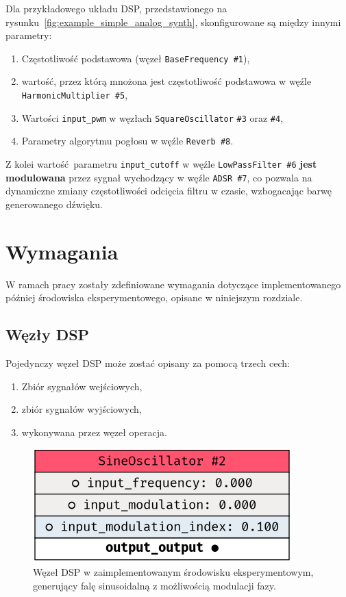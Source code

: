 \noindent
Dla przykładowego układu DSP, przedstawionego na rysunku~\ref{fig:example_simple_analog_synth},
skonfigurowane są między innymi parametry:

\begin{enumerate}
  \item Częstotliwość podstawowa (węzeł \texttt{BaseFrequency \#1}),
  \item wartość, przez którą mnożona jest częstotliwość podstawowa w węźle \texttt{HarmonicMultiplier \#5},
  \item Wartości \texttt{input\_pwm} w węzłach \texttt{SquareOscillator} \texttt{\#3} oraz \texttt{\#4},
  \item Parametry algorytmu pogłosu w węźle \texttt{Reverb \#8}.
\end{enumerate}

\noindent
Z kolei wartość parametru \texttt{input\_cutoff} w węźle \texttt{LowPassFilter \#6} \textbf{jest modulowana}
przez sygnał wychodzący w węźle \texttt{ADSR \#7}, co pozwala na dynamiczne zmiany
częstotliwości odcięcia filtru w czasie, wzbogacając barwę generowanego dźwięku.

\section{Wymagania}\label{sec:requirements}

W ramach pracy zostały zdefiniowane wymagania dotyczące implementowanego później środowiska eksperymentowego,
opisane w niniejszym rozdziale.

\subsection{Węzły DSP}

Pojedynczy węzeł DSP może zostać opisany za pomocą trzech cech:

\begin{enumerate}
  \item Zbiór sygnałów wejściowych,
  \item zbiór sygnałów wyjściowych,
  \item wykonywana przez węzeł operacja.
\end{enumerate}


\begin{figure}[H]\label{fig:example_sine_node}
    \centering
    \includegraphics[width=0.4\linewidth]{rys05/example_sine_node.png}
    \caption{
      Węzeł DSP w zaimplementowanym środowisku eksperymentowym, generujący falę sinusoidalną z możliwością modulacji fazy.
    }
\end{figure}

